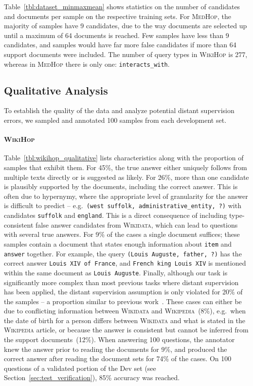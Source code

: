 \documentclass[11pt,letterpaper]{article}
\newcommand{\MedHop}{\textsc{MedHop}\xspace}
\newcommand{\WikiHop}{\textsc{WikiHop}\xspace}
\newcommand{\Wikidata}{\textsc{Wikidata}\xspace}
\newcommand{\Wikipedia}{\textsc{Wikipedia}\xspace}
\begin{document}
Table~\ref{tbl:dataset_minmaxmean} shows statistics on the number of candidates and documents per sample on the respective training sets.
For \MedHop, the majority of samples have 9 candidates, due to the way documents are selected up until a maximum of 64 documents is reached.
Few samples have less than 9 candidates, and samples would have far more false candidates if more than 64 support documents were included.
The number of query types in \WikiHop is 277, whereas in \MedHop there is only one: {\smaller \texttt{interacts\_with}}.

\subsection{Qualitative Analysis}
\label{sec:qualitative}
To establish the quality of the data and analyze potential distant supervision errors, we sampled and annotated 100 samples from each development set.


\paragraph{\WikiHop}
Table~\ref{tbl:wikihop_qualitative} lists characteristics along with the proportion of samples that exhibit them.
For 45\%, the true answer either uniquely follows from multiple texts directly or is suggested as likely.
For 26\%, more than one candidate is plausibly supported by the documents, including the correct answer.
This is often due to hypernymy, where the appropriate level of granularity for the answer is difficult to predict --  e.g.\
{\smaller \texttt{(west~suffolk, administrative\_entity, ?)}} with candidates {\smaller \texttt{suffolk}} and {\smaller \texttt{england}}.
This is a direct consequence of including type-consistent false answer candidates from \Wikidata, which can lead to questions with several true answers.
For 9\% of the cases a single document suffices; these samples contain a document that states enough information about {\smaller \texttt{item}} and {\smaller \texttt{answer}} together. 
For example, the query {\smaller \texttt{(Louis Auguste, father, ?)}} has the correct answer {\smaller \texttt{Louis XIV of France}}, and {\smaller \texttt{French king Louis XIV}} is mentioned within the same document as {\smaller \texttt{Louis Auguste}}.
Finally, although our task is significantly more complex than most previous tasks where distant supervision has been applied, the distant supervision assumption is only violated for 20\% of the samples -- a proportion similar to previous work~\cite{Riedel_2010_modeling}.
These cases can either be due to conflicting information between \Wikidata and \Wikipedia~(8\%), e.g.\ when the date of birth for a person differs between \Wikidata and what is stated in the \Wikipedia article, or because the answer is consistent but cannot be inferred from the support documents~(12\%).
When answering 100 questions, the annotator knew the answer prior to reading the documents for 9\%, and produced the correct answer after reading the document sets for 74\% of the cases.
On 100 questions of a validated portion of the Dev set (see Section~\ref{sec:test_verification}), 85\% accuracy was reached.
\end{document}
